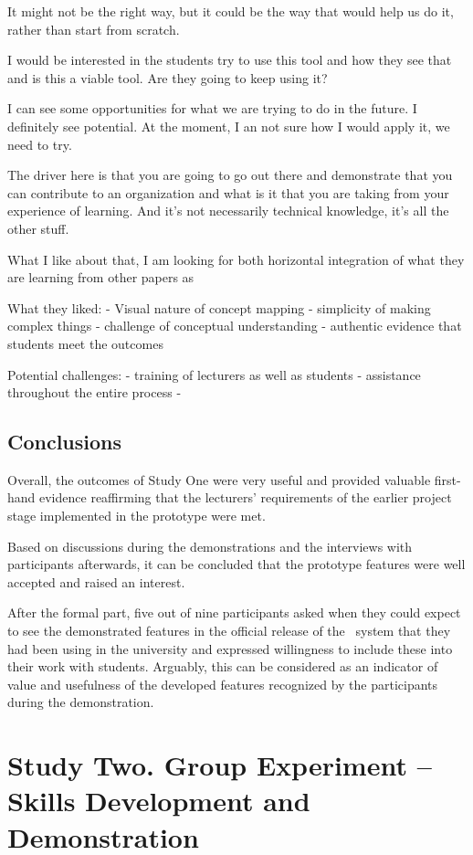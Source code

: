 It might not be the right way, but it could be the way that would help us do
it, rather than start from scratch.

I would be interested in the students try to use this tool and how they see that
and is this a viable tool. Are they going to keep using it?

I can see some opportunities for what we are trying to do in the future. I
definitely see potential. At the moment, I an not sure how I would apply it, we
need to try.

The driver here is that you are going to go out there and demonstrate that you
can contribute to an organization and what is it that you are taking from your
experience of learning. And it's not necessarily technical knowledge, it's all
the other stuff.

What I like about that, I am looking for both horizontal integration of what
they are learning from other papers as 

What they liked:
- Visual nature of concept mapping
- simplicity of making complex things
- challenge of conceptual understanding
- authentic evidence that students meet the outcomes

Potential challenges:
- training of lecturers as well as students 
- assistance throughout the entire process
- 

\subsection{Conclusions}

Overall, the outcomes of Study One were very useful and provided valuable
first-hand evidence reaffirming that the lecturers' requirements of the earlier
project stage implemented in the prototype were met.

Based on discussions during the demonstrations and the interviews with
participants afterwards, it can be concluded that the prototype features were
well accepted and raised an interest.

After the formal part, five out of nine participants asked when they could
expect to see the demonstrated features in the official release of the
\ep~system that they had been using in the university and expressed willingness
to include these into their work with students. Arguably, this can be considered
as an indicator of value and usefulness of the developed features recognized by
the participants during the demonstration.

\section{Study Two. Group Experiment -- \LLLc Skills Development and
Demonstration}
\label{sec:two}

